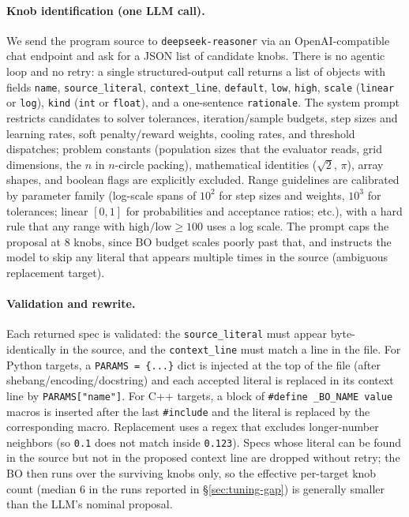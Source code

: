 \paragraph{Knob identification (one LLM call).}
We send the program source to \texttt{deepseek-reasoner} via an OpenAI-compatible chat endpoint and ask for a JSON list of candidate knobs. There is no agentic loop and no retry: a single structured-output call returns a list of objects with fields \texttt{name}, \texttt{source\_literal}, \texttt{context\_line}, \texttt{default}, \texttt{low}, \texttt{high}, \texttt{scale} (\texttt{linear} or \texttt{log}), \texttt{kind} (\texttt{int} or \texttt{float}), and a one-sentence \texttt{rationale}. The system prompt restricts candidates to solver tolerances, iteration/sample budgets, step sizes and learning rates, soft penalty/reward weights, cooling rates, and threshold dispatches; problem constants (population sizes that the evaluator reads, grid dimensions, the $n$ in $n$-circle packing), mathematical identities ($\sqrt{2}$, $\pi$), array shapes, and boolean flags are explicitly excluded. Range guidelines are calibrated by parameter family (log-scale spans of $10^{2}$ for step sizes and weights, $10^{3}$ for tolerances; linear $[0, 1]$ for probabilities and acceptance ratios; etc.), with a hard rule that any range with $\mathrm{high}/\mathrm{low} \ge 100$ uses a log scale. The prompt caps the proposal at 8 knobs, since BO budget scales poorly past that, and instructs the model to skip any literal that appears multiple times in the source (ambiguous replacement target).

\paragraph{Validation and rewrite.}
Each returned spec is validated: the \texttt{source\_literal} must appear byte-identically in the source, and the \texttt{context\_line} must match a line in the file. For Python targets, a \texttt{PARAMS = \{...\}} dict is injected at the top of the file (after shebang/encoding/docstring) and each accepted literal is replaced in its context line by \texttt{PARAMS["name"]}. For C++ targets, a block of \texttt{\#define \_BO\_NAME value} macros is inserted after the last \texttt{\#include} and the literal is replaced by the corresponding macro. Replacement uses a regex that excludes longer-number neighbors (so \texttt{0.1} does not match inside \texttt{0.123}). Specs whose literal can be found in the source but not in the proposed context line are dropped without retry; the BO then runs over the surviving knobs only, so the effective per-target knob count (median $6$ in the runs reported in \S\ref{sec:tuning-gap}) is generally smaller than the LLM's nominal proposal.

